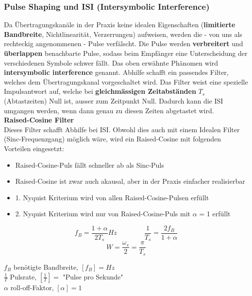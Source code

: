 \subsubsection{Pulse Shaping und ISI (Intersymbolic Interference) }
Da Übertragungskanäle in der Praxis keine idealen Eigenschaften 
(\textbf{limitierte Bandbreite}, Nichtlinearität, Verzerrungen) aufweisen,
werden die - von uns als rechteckig
angenommenen - Pulse verfälscht. Die Pulse werden \textbf{verbreitert} und \textbf{überlappen}
benachbarte Pulse, sodass beim Empfänger eine Unterscheidung der verschiedenen Symbole schwer
fällt. 
Das oben erwähnte Phänomen wird \textbf{intersymbolic interference} genannt.
Abhilfe schafft ein passendes Filter, welches dem Übertragungskanal vorgeschaltet wird. Das Filter
weist eine spezielle Impulsantwort auf, welche bei \textbf{gleichmässigen Zeitabständen} $T_s$
(Abtastzeiten) Null ist, ausser zum Zeitpunkt Null. Dadurch kann die ISI umgangen werden, wenn dann
genau zu diesen Zeiten abgetastet wird. \\ 

\textbf{Raised-Cosine Filter} \\
Dieses Filter schafft Abhilfe bei ISI. Obwohl dies auch mit einem Idealen Filter
(Sinc-Frequenzgang) möglich wäre, wird ein Raised-Cosine mit folgenden Vorteilen eingesetzt:
\begin{itemize}
  \item Raised-Cosine-Puls fällt schneller ab als Sinc-Puls
  \item Raised-Cosine ist zwar auch akausal, aber in der Praxis einfacher realisierbar
  \item 1. Nyquist Kriterium wird von allen Raised-Cosine-Pulsen erfüllt
  \item 2. Nyquist Kriterium wird nur von Raised-Cosine-Puls mit $\alpha$ = 1 erfüllt
\end{itemize}

\begin{minipage}{9cm}
$$ f_B = \frac{1 + \alpha}{2 T_s} Hz \qquad \qquad \frac{1}{T_s} = \frac{2 f_B}{1 + \alpha}$$
$$ W = \frac{\omega_s}{2} = \frac{\pi}{T_s}$$
\end{minipage}
\begin{minipage}{9cm}
	$f_B$ benötigte Bandbreite, $[f_B] = Hz$ \\
	$\frac{1}{T}$ Pulsrate, $[\frac{1}{T}] = $ "Pulse pro Sekunde" \\
	$\alpha$ roll-off-Faktor, $[\alpha] = 1$ 
\end{minipage}
 
